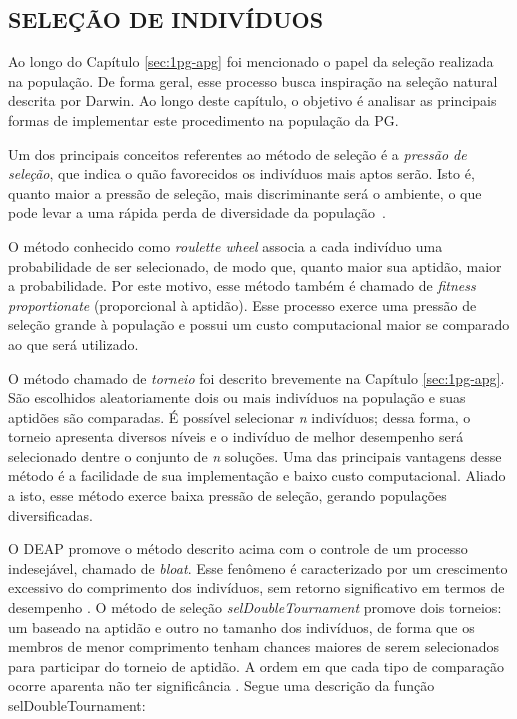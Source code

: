 \subsection{SELEÇÃO DE INDIVÍDUOS}\label{ssec:3deap-selecind}

Ao longo do Capítulo \ref{sec:1pg-apg} foi mencionado o papel da seleção realizada na população. De forma
geral, esse processo busca inspiração na seleção natural descrita por Darwin. Ao longo deste capítulo, o objetivo é analisar as principais formas de implementar este procedimento na população da PG.

Um dos principais conceitos referentes ao método de seleção é a \textit{pressão de seleção}, que indica o
quão favorecidos os indivíduos mais aptos serão. Isto é, quanto maior a pressão de seleção, mais discriminante
será o ambiente, o que pode levar a uma rápida perda de diversidade da população~\cite{poli08GpFieldGuide}.

O método conhecido como \textit{roulette wheel} associa a cada indivíduo uma probabilidade de ser
selecionado, de modo que, quanto maior sua aptidão, maior a probabilidade. Por este motivo, esse método também
é chamado de \textit{fitness proportionate} (proporcional à aptidão). Esse processo exerce uma pressão de seleção
grande à população e possui um custo computacional maior se comparado ao que será utilizado.

O método chamado de \textit{torneio} foi descrito brevemente na
Capítulo \ref{sec:1pg-apg}. São escolhidos aleatoriamente dois ou mais indivíduos na população e
suas aptidões são comparadas. É possível selecionar \textit{n} indivíduos; dessa forma, o torneio apresenta diversos níveis e o indivíduo de
melhor desempenho será selecionado dentre o conjunto de \textit{n} soluções. Uma das
principais vantagens desse método é a facilidade de sua implementação e baixo custo computacional. Aliado a isto, esse método exerce baixa pressão de seleção, gerando populações diversificadas.

O DEAP promove o método descrito acima com o controle de um processo indesejável, chamado de
\textit{bloat}. Esse fenômeno é caracterizado por um crescimento excessivo do comprimento dos indivíduos,
sem retorno significativo em termos de desempenho \cite{poli08GpFieldGuide}. O método de seleção
\textit{selDoubleTournament} promove dois torneios: um baseado na aptidão e outro no tamanho
dos indivíduos, de forma que os membros de menor comprimento tenham chances
maiores de serem selecionados para participar do torneio de aptidão. A ordem em que cada tipo de comparação ocorre aparenta não
ter significância \cite{deapdocs}. Segue uma descrição da função selDoubleTournament:

